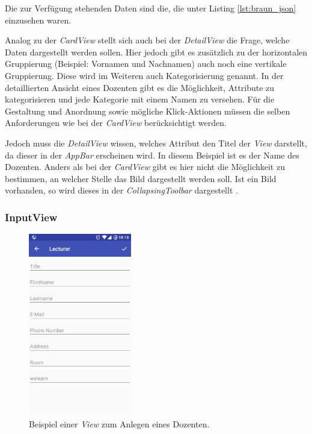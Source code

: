 Die zur Verfügung stehenden Daten sind die, die unter Listing \ref{lst:braun_json} einzusehen waren.

Analog zu der \textit{CardView} stellt sich auch bei der \textit{DetailView} die Frage, welche Daten dargestellt werden sollen. Hier jedoch gibt es zusätzlich zu der horizontalen Gruppierung (Beispiel: Vornamen und Nachnamen) auch noch eine vertikale Gruppierung. Diese wird im Weiteren auch Kategorisierung genannt. In der detaillierten Ansicht eines Dozenten gibt es die Möglichkeit, Attribute zu kategorisieren und jede Kategorie mit einem Namen zu versehen. Für die Gestaltung und Anordnung sowie mögliche Klick-Aktionen müssen die selben Anforderungen wie bei der \textit{CardView} berücksichtigt werden. 

Jedoch muss die \textit{DetailView} wissen, welches Attribut den Titel der \textit{View} darstellt, da dieser in der \textit{AppBar} erscheinen wird. In diesem Beispiel ist es der Name des Dozenten. Anders als bei der \textit{CardView} gibt es hier nicht die Möglichkeit zu bestimmen, an welcher Stelle das Bild dargestellt werden soll. Ist ein Bild vorhanden, so wird dieses in der \textit{CollapsingToolbar} dargestellt \cite{collapsing}.

\subsubsection{InputView}

\begin{figure}[H]
	\begin{center}
		\includegraphics[width=0.4\textwidth]{images/input.png}
		\caption{Beispiel einer \textit{View} zum Anlegen eines Dozenten.}
		\label{fig:input}
	\end{center}
\end{figure}

